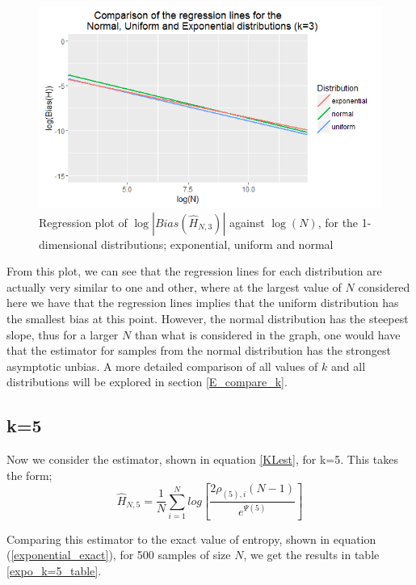\documentclass{report}
\begin{document}
\begin{figure}
  \begin{center}
    \includegraphics[width=\textwidth]{./Graphs/EUN_k=3_plot.png}
  \end{center}
\caption{Regression plot of $\log|Bias(\hat{H}_{N, 3})|$ against $\log(N)$, for the 1-dimensional distributions; exponential, uniform and normal}
  \label{E_U_N_k=3_graph}
\end{figure}

From this plot, we can see that the regression lines for each distribution are actually very similar to one and other, where at the largest value of $N$ considered here we have that the regression lines implies that the uniform distribution has the smallest bias at this point. However, the normal distribution has the steepest slope, thus for a larger $N$ than what is considered in the graph, one would have that the estimator for samples from the normal distribution has the strongest asymptotic unbias. A more detailed comparison of all values of $k$ and all distributions will be explored in section \ref{E_compare_k}.



\subsection{k=5} \label{E_k=5}
Now we consider the estimator, shown in equation \ref{KLest}, for k=5. This takes the form;
\begin{equation}
\hat{H}_{N, 5} = \frac{1}{N} \sum_{i=1}^{N} log \left[ \frac{2\rho_{(5),i}(N-1)}{e^{\Psi(5)}} \right] \nonumber
\end{equation}

Comparing this estimator to the exact value of entropy, shown in equation (\ref{exponential_exact}), for 500 samples of size $N$, we get the results in table \ref{expo_k=5_table}. 
\end{document}

